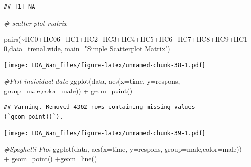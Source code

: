 \documentclass[
]{article}
\newenvironment{Shaded}{\begin{snugshade}}{\end{snugshade}}
\newcommand{\AttributeTok}[1]{\textcolor[rgb]{0.77,0.63,0.00}{#1}}
\newcommand{\CommentTok}[1]{\textcolor[rgb]{0.56,0.35,0.01}{\textit{#1}}}
\newcommand{\FunctionTok}[1]{\textcolor[rgb]{0.00,0.00,0.00}{#1}}
\newcommand{\NormalTok}[1]{#1}
\newcommand{\SpecialCharTok}[1]{\textcolor[rgb]{0.00,0.00,0.00}{#1}}
\newcommand{\StringTok}[1]{\textcolor[rgb]{0.31,0.60,0.02}{#1}}
\begin{document}
\begin{verbatim}
## [1] NA
\end{verbatim}

\begin{Shaded}
\begin{Highlighting}[]
\CommentTok{\# scatter plot matrix}

\FunctionTok{pairs}\NormalTok{(}\SpecialCharTok{\textasciitilde{}}\NormalTok{HC0}\SpecialCharTok{+}\NormalTok{HC06}\SpecialCharTok{+}\NormalTok{HC1}\SpecialCharTok{+}\NormalTok{HC2}\SpecialCharTok{+}\NormalTok{HC3}\SpecialCharTok{+}\NormalTok{HC4}\SpecialCharTok{+}\NormalTok{HC5}\SpecialCharTok{+}\NormalTok{HC6}\SpecialCharTok{+}\NormalTok{HC7}\SpecialCharTok{+}\NormalTok{HC8}\SpecialCharTok{+}\NormalTok{HC9}\SpecialCharTok{+}\NormalTok{HC10,}\AttributeTok{data=}\NormalTok{trenal.wide,}
   \AttributeTok{main=}\StringTok{"Simple Scatterplot Matrix"}\NormalTok{)}
\end{Highlighting}
\end{Shaded}

\texttt{[image: LDA\_Wan\_files/figure-latex/unnamed-chunk-38-1.pdf]}

\begin{Shaded}
\begin{Highlighting}[]
\CommentTok{\#Plot individual data}
\FunctionTok{ggplot}\NormalTok{(data, }\FunctionTok{aes}\NormalTok{(}\AttributeTok{x=}\NormalTok{time, }\AttributeTok{y=}\NormalTok{respons, }\AttributeTok{group=}\NormalTok{male,}\AttributeTok{color=}\NormalTok{male)) }\SpecialCharTok{+} \FunctionTok{geom\_point}\NormalTok{() }
\end{Highlighting}
\end{Shaded}

\begin{verbatim}
## Warning: Removed 4362 rows containing missing values (`geom_point()`).
\end{verbatim}

\texttt{[image: LDA\_Wan\_files/figure-latex/unnamed-chunk-39-1.pdf]}

\begin{Shaded}
\begin{Highlighting}[]
\CommentTok{\#Spaghetti Plot}
\FunctionTok{ggplot}\NormalTok{(data, }\FunctionTok{aes}\NormalTok{(}\AttributeTok{x=}\NormalTok{time, }\AttributeTok{y=}\NormalTok{respons, }\AttributeTok{group=}\NormalTok{male,}\AttributeTok{color=}\NormalTok{male)) }\SpecialCharTok{+} \FunctionTok{geom\_point}\NormalTok{() }\SpecialCharTok{+}\FunctionTok{geom\_line}\NormalTok{()}
\end{Highlighting}
\end{Shaded}
\end{document}
